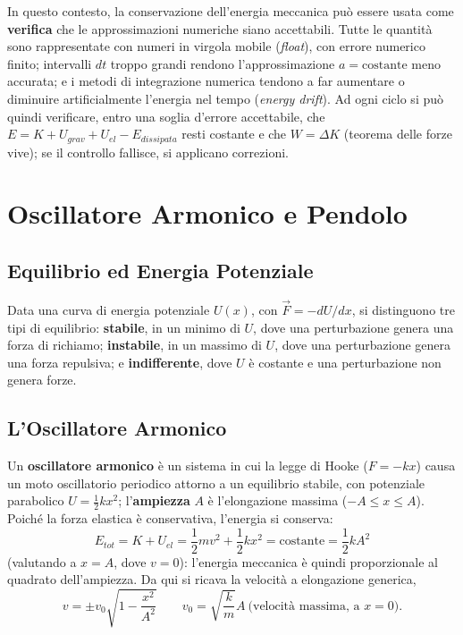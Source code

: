 \documentclass[a4paper,11pt]{article}
\begin{document}
In questo contesto, la conservazione dell'energia meccanica può essere usata come \textbf{verifica} che le approssimazioni numeriche siano accettabili. Tutte le quantità sono rappresentate con numeri in virgola mobile (\emph{float}), con errore numerico finito; intervalli $dt$ troppo grandi rendono l'approssimazione $a=\text{costante}$ meno accurata; e i metodi di integrazione numerica tendono a far aumentare o diminuire artificialmente l'energia nel tempo (\emph{energy drift}). Ad ogni ciclo si può quindi verificare, entro una soglia d'errore accettabile, che $E=K+U_{grav}+U_{el}-E_{dissipata}$ resti costante e che $W=\Delta K$ (teorema delle forze vive); se il controllo fallisce, si applicano correzioni.

\newpage
\section{Oscillatore Armonico e Pendolo}

\subsection{Equilibrio ed Energia Potenziale}

Data una curva di energia potenziale $U(x)$, con $\vec F=-dU/dx$, si distinguono tre tipi di equilibrio: \textbf{stabile}, in un minimo di $U$, dove una perturbazione genera una forza di richiamo; \textbf{instabile}, in un massimo di $U$, dove una perturbazione genera una forza repulsiva; e \textbf{indifferente}, dove $U$ è costante e una perturbazione non genera forze.

\subsection{L'Oscillatore Armonico}

Un \textbf{oscillatore armonico} è un sistema in cui la legge di Hooke ($F=-kx$) causa un moto oscillatorio periodico attorno a un equilibrio stabile, con potenziale parabolico $U=\frac12kx^2$; l'\textbf{ampiezza} $A$ è l'elongazione massima ($-A\leq x\leq A$). Poiché la forza elastica è conservativa, l'energia si conserva:
\[
E_{tot} = K+U_{el} = \frac12 mv^2+\frac12 kx^2 = \text{costante} = \frac12 kA^2
\]
(valutando a $x=A$, dove $v=0$): l'energia meccanica è quindi proporzionale al quadrato dell'ampiezza. Da qui si ricava la velocità a elongazione generica,
\[
v = \pm v_0\sqrt{1-\frac{x^2}{A^2}} \qquad v_0 = \sqrt{\frac{k}{m}}A \ \text{(velocità massima, a } x=0\text{)}.
\]
\end{document}
